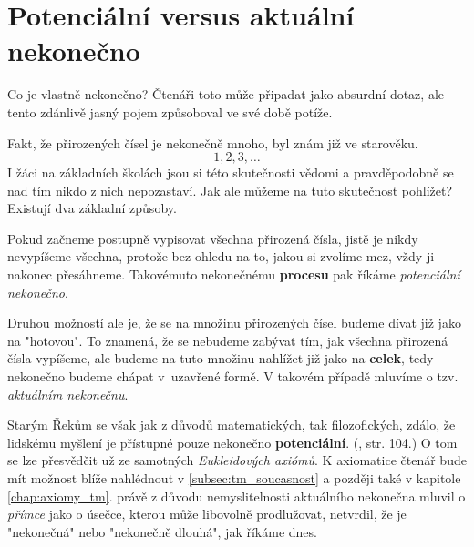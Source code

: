 \section{Potenciální versus aktuální nekonečno}\label{sec:pot_vs_akt_nekonecno}

Co je vlastně nekonečno? Čtenáři toto může připadat jako absurdní dotaz, ale tento zdánlivě jasný pojem způsoboval ve své době potíže.\par
Fakt, že přirozených čísel je nekonečně mnoho, byl znám již ve starověku.
\begin{equation*}
1,2,3,\dots
\end{equation*}
I žáci na základních školách jsou si této skutečnosti vědomi a pravděpodobně se nad tím nikdo z nich nepozastaví. Jak ale můžeme na tuto skutečnost pohlížet? Existují dva základní způsoby.\par
Pokud začneme postupně vypisovat všechna přirozená čísla, jistě je nikdy nevypíšeme všechna, protože bez ohledu na to, jakou si zvolíme mez, vždy ji nakonec přesáhneme. Takovémuto nekonečnému \textbf{procesu} pak říkáme \emph{potenciální nekonečno}.\par
Druhou možností ale je, že se na množinu přirozených čísel budeme dívat již jako na "hotovou". To znamená, že se nebudeme zabývat tím, jak všechna přirozená čísla vypíšeme, ale budeme na tuto množinu nahlížet již jako na \textbf{celek}, tedy nekonečno budeme chápat v~uzavřené formě. V takovém případě mluvíme o tzv. \emph{aktuálním nekonečnu}.
\medskip

Starým Řekům se však jak z důvodů matematických, tak filozofických, zdálo, že lidskému myšlení je přístupné pouze nekonečno \textbf{potenciální}. (\cite{Fuchs2003}, str. 104.) O tom se lze přesvědčit už ze samotných \emph{Eukleidových axiómů}. K axiomatice čtenář bude mít možnost blíže nahlédnout v \ref{subsec:tm_soucasnost} a později také v kapitole \ref{chap:axiomy_tm}.  právě z důvodu nemyslitelnosti aktuálního nekonečna mluvil o \emph{přímce} jako o úsečce, kterou může libovolně prodlužovat, netvrdil, že je "nekonečná" nebo "nekonečně dlouhá", jak říkáme dnes.

